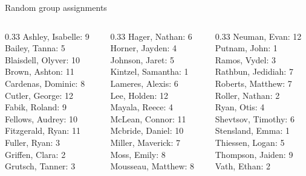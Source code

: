 \documentclass[10pt]{beamer}
\begin{document}
\begin{frame}{Random group assignments}
\begin{columns}
\begin{column}{0.33\textwidth}
Ashley, Isabelle: 9 \\ 
Bailey, Tanna: 5 \\ 
Blaisdell, Olyver: 10 \\ 
Brown, Ashton: 11 \\ 
Cardenas, Dominic: 8 \\ 
Cutler, George: 12 \\ 
Fabik, Roland: 9 \\ 
Fellows, Audrey: 10 \\ 
Fitzgerald, Ryan: 11 \\ 
Fuller, Ryan: 3 \\ 
Griffen, Clara: 2 \\ 
Grutsch, Tanner: 3 \\\end{column}
\begin{column}{0.33\textwidth}
Hager, Nathan: 6 \\ 
Horner, Jayden: 4 \\ 
Johnson, Jaret: 5 \\ 
Kintzel, Samantha: 1 \\ 
Lameres, Alexis: 6 \\ 
Lee, Holden: 12 \\ 
Mayala, Reece: 4 \\ 
McLean, Connor: 11 \\ 
Mcbride, Daniel: 10 \\ 
Miller, Maverick: 7 \\ 
Moss, Emily: 8 \\ 
Mousseau, Matthew: 8 \\\end{column}
\begin{column}{0.33\textwidth}
Neuman, Evan: 12 \\ 
Putnam, John: 1 \\ 
Ramos, Vydel: 3 \\ 
Rathbun, Jedidiah: 7 \\ 
Roberts, Matthew: 7 \\ 
Roller, Nathan: 2 \\ 
Ryan, Otis: 4 \\ 
Shevtsov, Timothy: 6 \\ 
Stensland, Emma: 1 \\ 
Thiessen, Logan: 5 \\ 
Thompson, Jaiden: 9 \\ 
Vath, Ethan: 2 \\\end{column}
\end{columns}
\end{frame}
\end{document}
